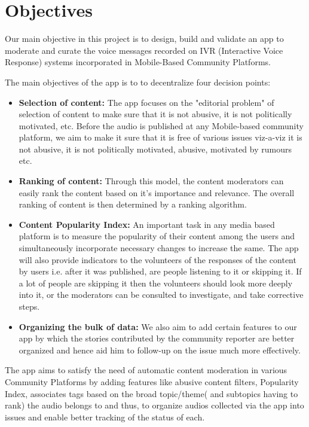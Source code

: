 \documentclass[11pt]{article}
\begin{document}
	\section{Objectives}
	Our main objective in this project is to design, build and validate an app to moderate and curate the voice messages recorded on IVR (Interactive Voice Response) systems incorporated in Mobile-Based Community Platforms.

    The main objectives of the app is to to decentralize four decision points:
     \begin{itemize}
				\item
				        \textbf{Selection of content: } The app focuses on the "editorial problem" of selection of content to make sure that it is not abusive, it is not politically motivated, etc. Before the audio is published at any Mobile-based community platform, we aim to make it sure that it is free of various issues viz-a-viz it is not abusive, it is not politically motivated, abusive, motivated by rumours etc.
				\item
				        \textbf{Ranking of content: } Through this model, the content moderators can easily rank the content based on it’s importance and relevance. The overall ranking of content is then determined by a ranking algorithm.
				        
				\item  \textbf{Content Popularity Index: } An important task in any media based platform is to measure the popularity of their content among the users and simultaneously incorporate necessary changes to increase the same. The app will also provide indicators to the volunteers of the responses of the content by users i.e. after it was published, are people listening to it or skipping it. If a lot of people are skipping it then the volunteers should look more deeply into it, or the moderators can be consulted to investigate, and take corrective steps.
				\item \textbf{Organizing the bulk of data: } We  also  aim  to  add  certain  features  to  our  app  by  which  the  stories  contributed  by the community reporter are better organized and hence aid him to follow-up on the issue much more effectively.
			\end{itemize}



\bigskip

The app aims to satisfy the need of automatic content moderation in various Community Platforms by adding features like abusive content filters, Popularity Index, associates tags based on the broad topic/theme( and subtopics having to rank) the audio belongs to and thus, to organize audios collected via the app into issues and enable better tracking of the status of each.
\pagebreak
\end{document}

